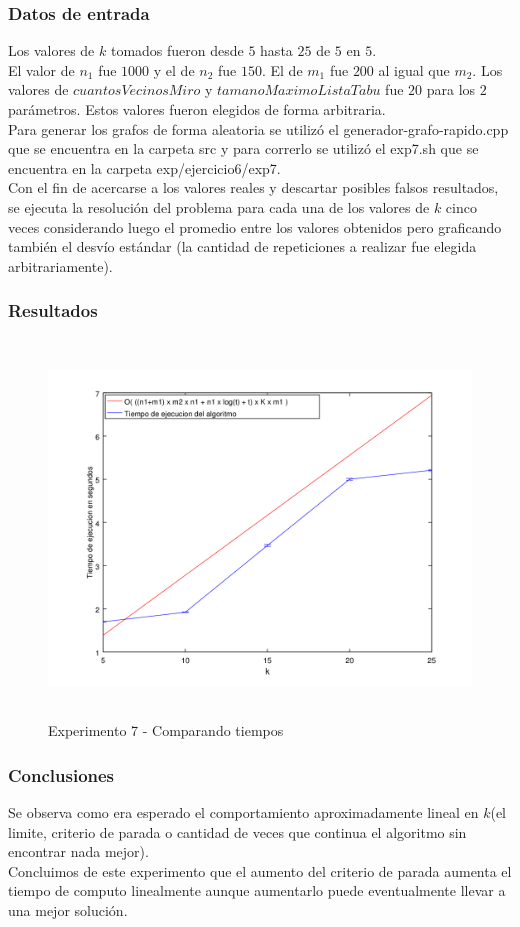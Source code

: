 \subsubsection*{Datos de entrada}\;
\noindent Los valores de $k$ tomados fueron desde $5$ hasta $25$ de $5$ en $5$. \\
       El valor de $n_1$ fue $1000$ y el de $n_2$ fue $150$. El de $m_1$ fue $200$ al igual que $m_2$.  Los valores de $cuantosVecinosMiro$ y $tamanoMaximoListaTabu$ fue $20$ para los $2$ parámetros. Estos valores fueron elegidos de forma arbitraria. \\
        Para generar los grafos de forma aleatoria se utilizó el generador-grafo-rapido.cpp que se encuentra en la carpeta src y para correrlo se utilizó el exp7.sh que se encuentra en la carpeta exp/ejercicio6/exp7. \\
        Con el fin de acercarse a los valores reales y descartar posibles falsos resultados, se ejecuta la resolución del problema para cada una de los valores de $k$ cinco veces considerando luego el promedio entre los valores obtenidos pero graficando también el desvío estándar (la cantidad de repeticiones a realizar fue elegida arbitrariamente).\;
\subsubsection*{Resultados}\;
    \begin{figure}[H]
      \includegraphics[height=10cm]{graficos/ejercicio6-exp7-tiempos.png}
       \caption{Experimento 7 - Comparando tiempos}
	\end{figure}



\subsubsection*{Conclusiones}\;
Se observa como era esperado el comportamiento aproximadamente lineal en $k$(el limite, criterio de parada o cantidad de veces que continua el algoritmo sin encontrar nada mejor).\\
Concluimos de este experimento que el aumento del criterio de parada aumenta el tiempo de computo linealmente aunque aumentarlo puede eventualmente llevar a una mejor solución.

